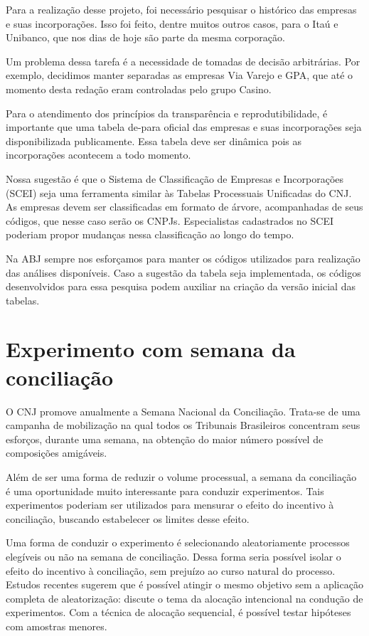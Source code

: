 \documentclass[]{report}
\begin{document}
Para a realização desse projeto, foi necessário pesquisar o histórico
das empresas e suas incorporações. Isso foi feito, dentre muitos outros
casos, para o Itaú e Unibanco, que nos dias de hoje são parte da mesma
corporação.

Um problema dessa tarefa é a necessidade de tomadas de decisão
arbitrárias. Por exemplo, decidimos manter separadas as empresas Via
Varejo e GPA, que até o momento desta redação eram controladas pelo
grupo Casino.

Para o atendimento dos princípios da transparência e reprodutibilidade,
é importante que uma tabela de-para oficial das empresas e suas
incorporações seja disponibilizada publicamente. Essa tabela deve ser
dinâmica pois as incorporações acontecem a todo momento.

Nossa sugestão é que o Sistema de Classificação de Empresas e
Incorporações (SCEI) seja uma ferramenta similar às Tabelas Processuais
Unificadas do CNJ. As empresas devem ser classificadas em formato de
árvore, acompanhadas de seus códigos, que nesse caso serão os CNPJs.
Especialistas cadastrados no SCEI poderiam propor mudanças nessa
classificação ao longo do tempo.

Na ABJ sempre nos esforçamos para manter os códigos utilizados para
realização das análises disponíveis. Caso a sugestão da tabela seja
implementada, os códigos desenvolvidos para essa pesquisa podem auxiliar
na criação da versão inicial das tabelas.

\section{Experimento com semana da
conciliação}\label{experimento-com-semana-da-conciliacao}

O CNJ promove anualmente a Semana Nacional da Conciliação. Trata-se de
uma campanha de mobilização na qual todos os Tribunais Brasileiros
concentram seus esforços, durante uma semana, na obtenção do maior
número possível de composições amigáveis.

Além de ser uma forma de reduzir o volume processual, a semana da
conciliação é uma oportunidade muito interessante para conduzir
experimentos. Tais experimentos poderiam ser utilizados para mensurar o
efeito do incentivo à conciliação, buscando estabelecer os limites desse
efeito.

Uma forma de conduzir o experimento é selecionando aleatoriamente
processos elegíveis ou não na semana de conciliação. Dessa forma seria
possível isolar o efeito do incentivo à conciliação, sem prejuízo ao
curso natural do processo. Estudos recentes sugerem que é possível
atingir o mesmo objetivo sem a aplicação completa de aleatorização:
\citep{Fossaluza2015} discute o tema da alocação intencional na condução
de experimentos. Com a técnica de alocação sequencial, é possível testar
hipóteses com amostras menores.
\end{document}

